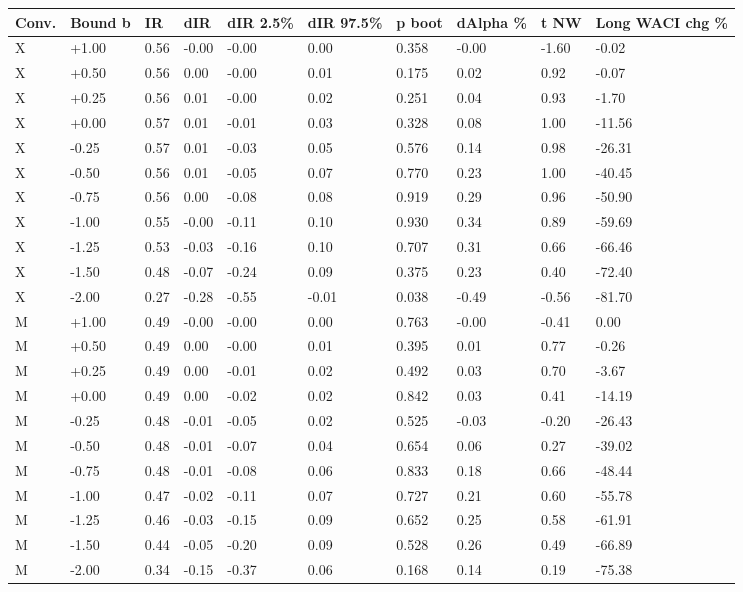 \begin{tabular}{llllllllll}
\toprule
Conv. & Bound b & IR & dIR & dIR 2.5\% & dIR 97.5\% & p boot & dAlpha \% & t NW & Long WACI chg \% \\
\midrule
X & +1.00 & 0.56 & -0.00 & -0.00 & 0.00 & 0.358 & -0.00 & -1.60 & -0.02 \\
X & +0.50 & 0.56 & 0.00 & -0.00 & 0.01 & 0.175 & 0.02 & 0.92 & -0.07 \\
X & +0.25 & 0.56 & 0.01 & -0.00 & 0.02 & 0.251 & 0.04 & 0.93 & -1.70 \\
X & +0.00 & 0.57 & 0.01 & -0.01 & 0.03 & 0.328 & 0.08 & 1.00 & -11.56 \\
X & -0.25 & 0.57 & 0.01 & -0.03 & 0.05 & 0.576 & 0.14 & 0.98 & -26.31 \\
X & -0.50 & 0.56 & 0.01 & -0.05 & 0.07 & 0.770 & 0.23 & 1.00 & -40.45 \\
X & -0.75 & 0.56 & 0.00 & -0.08 & 0.08 & 0.919 & 0.29 & 0.96 & -50.90 \\
X & -1.00 & 0.55 & -0.00 & -0.11 & 0.10 & 0.930 & 0.34 & 0.89 & -59.69 \\
X & -1.25 & 0.53 & -0.03 & -0.16 & 0.10 & 0.707 & 0.31 & 0.66 & -66.46 \\
X & -1.50 & 0.48 & -0.07 & -0.24 & 0.09 & 0.375 & 0.23 & 0.40 & -72.40 \\
X & -2.00 & 0.27 & -0.28 & -0.55 & -0.01 & 0.038 & -0.49 & -0.56 & -81.70 \\
M & +1.00 & 0.49 & -0.00 & -0.00 & 0.00 & 0.763 & -0.00 & -0.41 & 0.00 \\
M & +0.50 & 0.49 & 0.00 & -0.00 & 0.01 & 0.395 & 0.01 & 0.77 & -0.26 \\
M & +0.25 & 0.49 & 0.00 & -0.01 & 0.02 & 0.492 & 0.03 & 0.70 & -3.67 \\
M & +0.00 & 0.49 & 0.00 & -0.02 & 0.02 & 0.842 & 0.03 & 0.41 & -14.19 \\
M & -0.25 & 0.48 & -0.01 & -0.05 & 0.02 & 0.525 & -0.03 & -0.20 & -26.43 \\
M & -0.50 & 0.48 & -0.01 & -0.07 & 0.04 & 0.654 & 0.06 & 0.27 & -39.02 \\
M & -0.75 & 0.48 & -0.01 & -0.08 & 0.06 & 0.833 & 0.18 & 0.66 & -48.44 \\
M & -1.00 & 0.47 & -0.02 & -0.11 & 0.07 & 0.727 & 0.21 & 0.60 & -55.78 \\
M & -1.25 & 0.46 & -0.03 & -0.15 & 0.09 & 0.652 & 0.25 & 0.58 & -61.91 \\
M & -1.50 & 0.44 & -0.05 & -0.20 & 0.09 & 0.528 & 0.26 & 0.49 & -66.89 \\
M & -2.00 & 0.34 & -0.15 & -0.37 & 0.06 & 0.168 & 0.14 & 0.19 & -75.38 \\
\bottomrule
\end{tabular}
